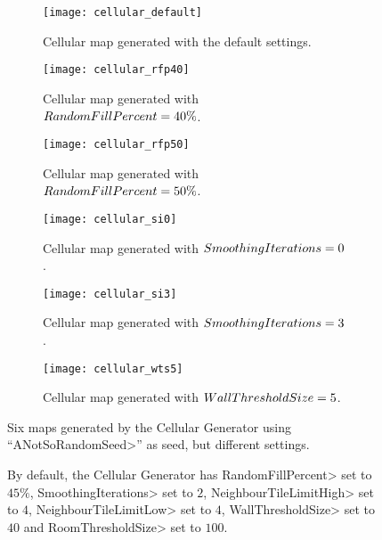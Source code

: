 \begin{figure}[tp]
	\centering
  	\begin{subfigure}[t]{0.325\linewidth}
		\texttt{[image: cellular\_default]}
     		\caption{Cellular map generated with the default settings.}
 	\end{subfigure}
  	\begin{subfigure}[t]{0.325\linewidth}
    		\texttt{[image: cellular\_rfp40]}
    		\caption{Cellular map generated with $Ran\-dom\-Fill\-Per\-cent = 40\%$.}
  	\end{subfigure}
  	\begin{subfigure}[t]{0.325\linewidth}
    		\texttt{[image: cellular\_rfp50]}
    		\caption{Cellular map generated with $Ran\-dom\-Fill\-Per\-cent = 50\%$.}
  	\end{subfigure}
  	\begin{subfigure}[t]{0.325\linewidth}
		\texttt{[image: cellular\_si0]}
     		\caption{Cellular map generated with $Smooth\-ing\-It\-er\-a\-tions = 0$.}
 	\end{subfigure}
  	\begin{subfigure}[t]{0.325\linewidth}
    		\texttt{[image: cellular\_si3]}
     		\caption{Cellular map generated with $Smooth\-ing\-It\-er\-a\-tions = 3$.}
  	\end{subfigure}
  	\begin{subfigure}[t]{0.325\linewidth}
    		\texttt{[image: cellular\_wts5]}
     		\caption{Cellular map generated with $Wall\-Thresh\-old\-Size = 5$.}
  	\end{subfigure}	
	\caption{Six maps generated by the Cellular Generator using ``\<ANotSoRandomSeed>'' as seed, but different settings.}
	\caption*{By default, the Cellular Generator has \<RandomFillPercent> set to $45\%$, \<SmoothingIterations> set to $2$,  \<NeighbourTileLimitHigh> set to $4$,  \<NeighbourTileLimitLow> set to $4$,  \<WallThresholdSize> set to $40$ and \<RoomThresholdSize> set to $100$.}
	\label{fig:cellulars}
\end{figure}

